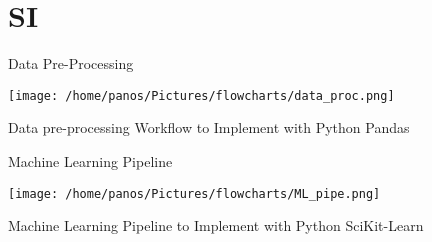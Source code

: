 \documentclass[10pt, aspectratio=169, presentation]{beamer}
\begin{document}
\section{SI}
\label{sec:org2778532}
\begin{frame}[label={sec:orge0924f0}]{Data Pre-Processing}
\begin{center}
\texttt{[image: /home/panos/Pictures/flowcharts/data\_proc.png]}
\end{center}
Data pre-processing Workflow to Implement with Python Pandas
\end{frame}
\begin{frame}[label={sec:orga7b1a97}]{Machine Learning Pipeline}
\begin{center}
\texttt{[image: /home/panos/Pictures/flowcharts/ML\_pipe.png]}
\end{center}
Machine Learning Pipeline to Implement with Python SciKit-Learn
\end{frame}
\end{document}
